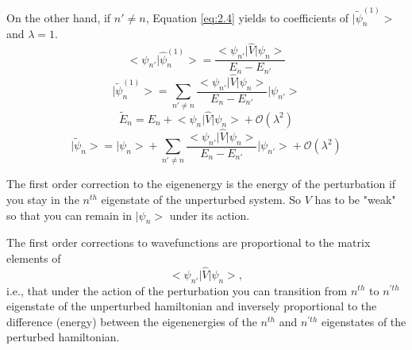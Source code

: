 \documentclass[12pt]{article}
\begin{document}
On the other hand, if $n'\neq n$, Equation \ref{eq:2.4} yields to coefficients of $\big | \tilde{\psi}^{(1)}_n\big>$ and $\lambda = 1$.
\begin{equation*}
	\big < \psi_{n'} |\hat{\psi}^{(1)}_n \big> = \frac{\big< \psi_{n'}\big|\hat{V}\big|\psi_n
	\big>}{E_n - E_{n'}}
\end{equation*}
\begin{equation*}
	\big|\tilde{\psi}^{(1)}_n \big> = \sum_{n' \neq n}
	\frac{\big< \psi_{n'}\big|\hat{V}\big|\psi_n\big>}{E_n - E_{n'}}\big|\psi_{n'}\big>
\end{equation*}
\begin{equation*}
	\tilde{E}_n = E_n +\big< \psi_{n}\big|\hat{V}\big|\psi_n\big> + \mathcal{O}(\lambda^2) 
\end{equation*}
\begin{equation}
	\big| \tilde{\psi}_n \big> = \big| \psi_n \big> +\sum_{n' \neq n}
	\frac{\big< \psi_{n'}\big|\hat{V}\big|\psi_n\big>}{E_n - E_{n'}}\big|\psi_{n'}\big> + \mathcal{O}(\lambda^2)
\end{equation}

The first order correction to the eigenenergy is the energy of the perturbation if you stay in the
$n^{th}$ eigenstate of the unperturbed system. So $V$  has to be "weak" so that you can remain in
$\big|\psi_n\big>$ under its action.

The first order corrections to wavefunctions are proportional to the matrix elements of  
$$\big<\psi_{n'}\big|\hat{V}\big|\psi_n\big>,$$
i.e., that under the action of the perturbation you can transition from $n^{th}$ to $n^{'th}$ 
eigenstate of the unperturbed hamiltonian and inversely proportional to the difference (energy)
between the eigenenergies of the $n^{th}$ and $n^{'th}$  eigenstates of the perturbed hamiltonian.
\end{document}
